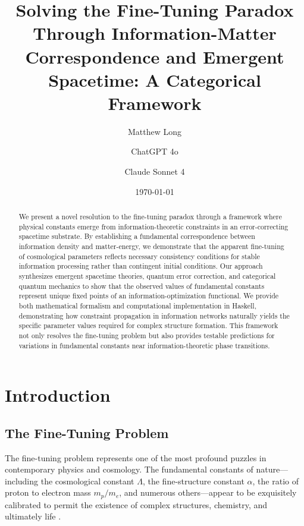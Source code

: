 \documentclass[12pt,a4paper]{article}
\title{\textbf{Solving the Fine-Tuning Paradox Through Information-Matter Correspondence and Emergent Spacetime: A Categorical Framework}}
\author[1]{Matthew Long}
\author[2]{ChatGPT 4o}
\author[3]{Claude Sonnet 4}
\affil[1]{Yoneda AI}
\affil[2]{OpenAI}
\affil[3]{Anthropic}
\date{\today}
\begin{document}
\maketitle

\begin{abstract}
We present a novel resolution to the fine-tuning paradox through a framework where physical constants emerge from information-theoretic constraints in an error-correcting spacetime substrate. By establishing a fundamental correspondence between information density and matter-energy, we demonstrate that the apparent fine-tuning of cosmological parameters reflects necessary consistency conditions for stable information processing rather than contingent initial conditions. Our approach synthesizes emergent spacetime theories, quantum error correction, and categorical quantum mechanics to show that the observed values of fundamental constants represent unique fixed points of an information-optimization functional. We provide both mathematical formalism and computational implementation in Haskell, demonstrating how constraint propagation in information networks naturally yields the specific parameter values required for complex structure formation. This framework not only resolves the fine-tuning problem but also provides testable predictions for variations in fundamental constants near information-theoretic phase transitions.
\end{abstract}


\onehalfspacing

\tableofcontents

\newpage

\section{Introduction}

\subsection{The Fine-Tuning Problem}

The fine-tuning problem represents one of the most profound puzzles in contemporary physics and cosmology. The fundamental constants of nature—including the cosmological constant $\Lambda$, the fine-structure constant $\alpha$, the ratio of proton to electron mass $m_p/m_e$, and numerous others—appear to be exquisitely calibrated to permit the existence of complex structures, chemistry, and ultimately life \cite{Barrow1986, Rees1999}.
\end{document}
